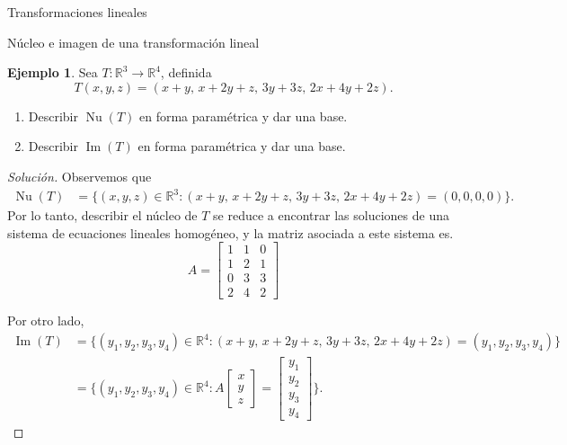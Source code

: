 \documentclass[a4paper,12pt,twoside,spanish,reqno]{amsbook}
\theoremstyle{definition}
\newtheorem{ejemplo}{Ejemplo}[section]
\theoremstyle{remark}
\newcommand{\img}{\operatorname{Im}}
\newcommand{\nuc}{\operatorname{Nu}}
\newcommand{\R}{\mathbb R}
\begin{document}
\begin{chapter}{Transformaciones lineales}
\begin{section}{Núcleo e imagen de una transformación lineal}
        \begin{ejemplo}
        Sea $T: \R^3 \to \R^4$, definida
        $$
        T(x,y,z) = (x +y ,\,x +2y +z,\,3y +3z,\,2x +4y +2z).
        $$
        \begin{enumerate}
            \item Describir $\nuc(T)$  en forma paramétrica y dar una base.
            \item Describir $\img(T)$  en forma paramétrica y  dar una base. 
        \end{enumerate}
        \begin{proof}[Solución] 
        Observemos que 
        \begin{align*}
        \nuc(T) &= \{(x,y,z)\in \R^3: (x +y ,\,x +2y +z,\,3y +3z,\,2x +4y +2z) =(0,0,0,0)\}.
        \end{align*}
        Por  lo tanto, describir el núcleo de $T$ se reduce a encontrar las soluciones de una sistema de ecuaciones lineales homogéneo, y la matriz asociada a este sistema es.   
        \begin{equation*}
        A = \begin{bmatrix}
        1&1&0\\1&2&1\\0&3&3\\2&4&2
        \end{bmatrix}
        \end{equation*}
        
        Por  otro lado,
        \begin{align*}
        \img(T) &= \{(y_1,y_2,y_3,y_4)\in \R^4: (x +y ,\,x +2y +z,\,3y +3z,\,2x +4y +2z) =(y_1,y_2,y_3,y_4)\}\\
        &=  \{(y_1,y_2,y_3,y_4)\in \R^4: A\begin{bmatrix}x\\y\\z	\end{bmatrix}  =
        \begin{bmatrix}y_1\\y_2\\y_3\\y_4\end{bmatrix}\}.
        \end{align*}
        

\end{proof}
\end{ejemplo}
\end{section}
\end{chapter}
\end{document}
